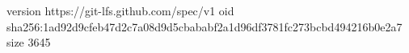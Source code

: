 version https://git-lfs.github.com/spec/v1
oid sha256:1ad92d9cfeb47d2c7a08d9d5cbababf2a1d96df3781fc273bcbd494216b0e2a7
size 3645
